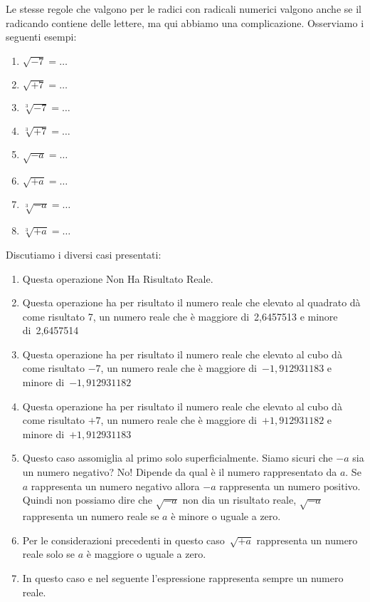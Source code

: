 Le stesse regole che valgono per le radici con radicali numerici valgono 
anche se il radicando contiene delle lettere, ma qui abbiamo una 
complicazione.
Osserviamo i seguenti esempi:

\begin{htmulticols}{4}
\begin{enumerate}
\item \(\sqrt{-7}=\dots\)
\item \(\sqrt{+7}=\dots\) 
\item \(\sqrt[3]{-7}=\dots\)
\item \(\sqrt[3]{+7}=\dots\)
\item \(\sqrt{-a}=\dots\)
\item \(\sqrt{+a}=\dots\)
\item \(\sqrt[3]{-a}=\dots\)
\item \(\sqrt[3]{+a}=\dots\)
\end{enumerate}
\end{htmulticols}

Discutiamo i diversi casi presentati:

\begin{enumerate}
\item Questa operazione Non Ha Risultato Reale.
\item Questa operazione ha per risultato il numero reale che elevato al 
quadrato dà come risultato 7, un numero reale che è maggiore 
di~2,6457513 e minore di~2,6457514
\item Questa operazione ha per risultato il numero reale che elevato al 
cubo dà come risultato \(-7\), un numero reale che è maggiore 
di~\(-1,912931183\) e minore di~\(-1,912931182\)
\item Questa operazione ha per risultato il numero reale che elevato al 
cubo dà come risultato \(+7\), un numero reale che è maggiore 
di~\(+1,912931182\) e minore di~\(+1,912931183\)
\item Questo caso assomiglia al primo solo superficialmente. Siamo sicuri 
che \(-a\) sia un numero negativo? No! Dipende da qual è il numero 
rappresentato da \(a\). 
Se \(a\) rappresenta un numero negativo allora \(-a\) rappresenta un 
numero positivo. 
Quindi non possiamo dire che \(\sqrt{-a}\) non dia un risultato reale, 
\(\sqrt{-a}\) rappresenta un numero reale se \(a\) è 
minore o uguale a zero.
\item Per le considerazioni precedenti in questo caso~\(\sqrt{+a}\) 
rappresenta un numero reale solo se \(a\) è maggiore o uguale a zero.
\item In questo caso e nel seguente l'espressione rappresenta sempre un 
numero reale.
\end{enumerate}

